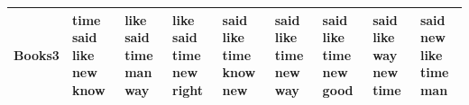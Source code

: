 \documentclass[11pt,a4paper]{article}
\begin{document}
\begin{appendices}
\begin{table}[htp]
\begin{tiny}
\begin{tabular}{|p{}|p{}|p{}|p{}|p{}|p{}|p{}|p{}|p{}|}
Books3 & time \newline said \newline like \newline new \newline know & like \newline said \newline time \newline man \newline way & like \newline said \newline time \newline new \newline right & said \newline like \newline time \newline know \newline new & said \newline like \newline time \newline new \newline way & said \newline like \newline time \newline new \newline good & said \newline like \newline way \newline new \newline time & said \newline new \newline like \newline time \newline man\\\hline

\end{tabular}
\end{tiny}
\end{table}
\end{appendices}
\end{document}

